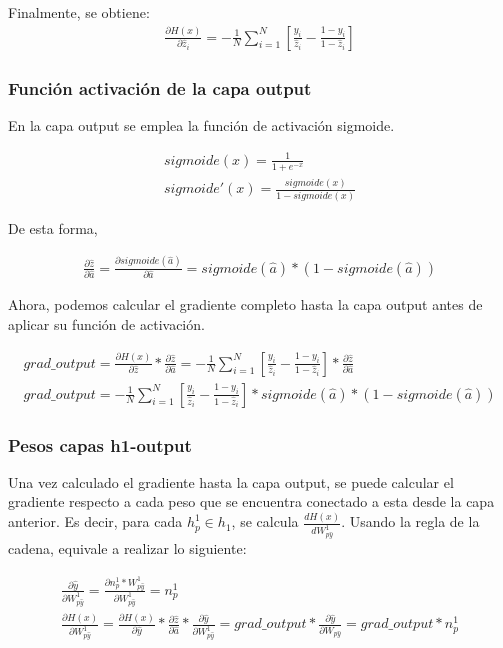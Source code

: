 Finalmente, se obtiene: 
\begin{gather}
	\frac{\partial H(x)}{\partial \hat{z}_i} = - \frac{1}{N} \sum_{i=1}^{N}  [ \frac{y_i}{\hat{z}_i} - \frac{1-y_i}{1-\hat{z}_i} ]
\end{gather}

\subsubsection{Función activación de la capa output}
En la capa output se emplea la función de activación sigmoide. 

\begin{gather}
	sigmoide(x) = \frac{1}{1+e^{-x}} \\
	sigmoide'(x) = \frac{sigmoide(x)}{1-sigmoide(x)}
\end{gather}

De esta forma,

\begin{gather}
	\frac{\partial \hat{z}}{\partial \hat{a}} = \frac{\partial sigmoide(\hat{a})}{\partial \hat{a}} = sigmoide(\hat{a})*(1-sigmoide(\hat{a}))
\end{gather}

Ahora, podemos calcular el gradiente completo hasta la capa output antes de aplicar su función de activación.

\begin{gather}
	grad\_output = \frac{\partial H(x)}{\partial \hat{z}} * \frac{\partial \hat{z}}{\partial \hat{a}} =
	- \frac{1}{N} \sum_{i=1}^{N}  [ \frac{y_i}{\hat{z}_i} - \frac{1-y_i}{1-\hat{z}_i} ] * \frac{\partial \hat{z}}{\partial \hat{a}} \\
	grad\_output = - \frac{1}{N} \sum_{i=1}^{N}  [ \frac{y_i}{\hat{z}_i} - \frac{1-y_i}{1-\hat{z}_i} ] * sigmoide(\hat{a})*(1-sigmoide(\hat{a}))
\end{gather}

\subsubsection{Pesos capas h1-output}

Una vez calculado el gradiente hasta la capa output, se puede calcular el gradiente respecto a cada peso que se encuentra conectado a esta desde la capa anterior. Es decir, para cada $h^1_p\in h_1$, se calcula $\frac{dH(x)}{dW^1_{p\hat{y}}}$. Usando la regla de la cadena, equivale a realizar lo siguiente:

\begin{gather}
	\frac{\partial \hat{y}}{\partial W^1_{p\hat{y}}} = \frac{\partial n^1_p * W^1 _{p\hat{y} }}{\partial W^1_{p\hat{y} }} = n^1_p \\
	\frac{\partial H(x)}{\partial W^1_{p\hat{y} }} = \frac{\partial H(x)}{\partial \hat{y}} * \frac{\partial\hat{z}}{\partial \hat{a}} * \frac{\partial \hat{y}}{\partial W^1_{p\hat{y} }} =  grad\_output * \frac{\partial \hat{y}}{\partial W_{p\hat{y} }} = grad\_output * n^1_p
\end{gather}

